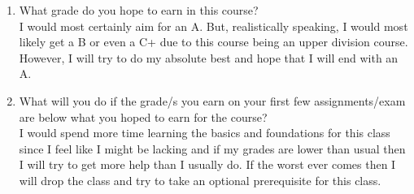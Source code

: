 \documentclass{article}
\begin{document}
\begin{enumerate}
\item What grade do you hope to earn in this course?\\

I would most certainly aim for an A. But, realistically speaking, I would most likely get a B or even a C+ due to this course being an upper division course. However, I will try to do my absolute best and hope that I will end with an A.

\item What will you do if the grade/s you earn on your first few assignments/exam are below what you hoped to earn for the course? \\

I would spend more time learning the basics and foundations for this class since I feel like I might be lacking and if my grades are lower than usual then I will try to get more help than I usually do. If the worst ever comes then I will drop the class and try to take an optional prerequisite for this class.\\
\end{enumerate}
\end{document}

